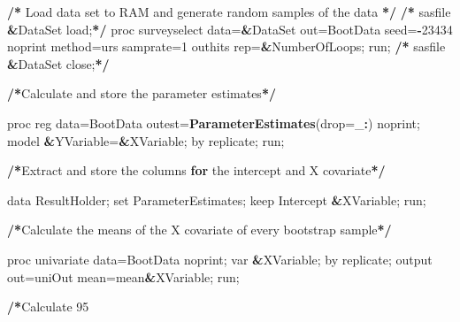 \documentclass[]{article}
\newenvironment{Shaded}{\begin{snugshade}}{\end{snugshade}}
\newcommand{\KeywordTok}[1]{\textcolor[rgb]{0.13,0.29,0.53}{\textbf{#1}}}
\newcommand{\DataTypeTok}[1]{\textcolor[rgb]{0.13,0.29,0.53}{#1}}
\newcommand{\DecValTok}[1]{\textcolor[rgb]{0.00,0.00,0.81}{#1}}
\newcommand{\StringTok}[1]{\textcolor[rgb]{0.31,0.60,0.02}{#1}}
\newcommand{\ControlFlowTok}[1]{\textcolor[rgb]{0.13,0.29,0.53}{\textbf{#1}}}
\newcommand{\OperatorTok}[1]{\textcolor[rgb]{0.81,0.36,0.00}{\textbf{#1}}}
\newcommand{\ErrorTok}[1]{\textcolor[rgb]{0.64,0.00,0.00}{\textbf{#1}}}
\newcommand{\NormalTok}[1]{#1}
\begin{document}
\begin{Shaded}
\begin{Highlighting}[]
\NormalTok{%

\OperatorTok{/}\ErrorTok{*}\StringTok{ }\NormalTok{Load data set to RAM and generate random samples of the data }\OperatorTok{*}\ErrorTok{/}
\ErrorTok{/*}\StringTok{       }\NormalTok{sasfile }\OperatorTok{&}\NormalTok{DataSet load;}\OperatorTok{*}\ErrorTok{/}
\StringTok{       }\NormalTok{proc surveyselect data=}\ErrorTok{&}\NormalTok{DataSet out=BootData seed=}\OperatorTok{-}\DecValTok{23434}\NormalTok{ noprint}
\NormalTok{       method=urs samprate=}\DecValTok{1}\NormalTok{ outhits rep=}\ErrorTok{&}\NormalTok{NumberOfLoops;}
\NormalTok{       run;}
\OperatorTok{/}\ErrorTok{*}\StringTok{       }\NormalTok{sasfile }\OperatorTok{&}\NormalTok{DataSet close;}\OperatorTok{*}\ErrorTok{/}

\ErrorTok{/*}\NormalTok{Calculate and store the parameter estimates}\OperatorTok{*}\ErrorTok{/}

\StringTok{       }\NormalTok{proc reg data=BootData outest=}\KeywordTok{ParameterEstimates}\NormalTok{(}\DataTypeTok{drop=}\NormalTok{_}\OperatorTok{:}\NormalTok{) noprint;}
\NormalTok{       model }\OperatorTok{&}\NormalTok{YVariable=}\ErrorTok{&}\NormalTok{XVariable;}
\NormalTok{       by replicate;}
\NormalTok{       run;}

\OperatorTok{/}\ErrorTok{*}\NormalTok{Extract and store the columns }\ControlFlowTok{for}\NormalTok{ the intercept and X covariate}\OperatorTok{*}\ErrorTok{/}

\StringTok{       }\NormalTok{data ResultHolder;}
\NormalTok{       set ParameterEstimates;}
\NormalTok{       keep Intercept }\OperatorTok{&}\NormalTok{XVariable;}
\NormalTok{       run;}

\OperatorTok{/}\ErrorTok{*}\NormalTok{Calculate the means of the X covariate of every bootstrap sample}\OperatorTok{*}\ErrorTok{/}

\StringTok{       }\NormalTok{proc univariate data=BootData noprint;}
\NormalTok{       var }\OperatorTok{&}\NormalTok{XVariable;}
\NormalTok{       by replicate;}
\NormalTok{       output out=uniOut mean=mean}\OperatorTok{&}\NormalTok{XVariable;}
\NormalTok{       run;}

\OperatorTok{/}\ErrorTok{*}\NormalTok{Calculate }\DecValTok{95}\NormalTok{%

}}
\end{Highlighting}
\end{Shaded}
\end{document}
